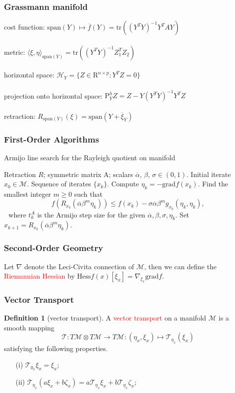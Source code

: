 \documentclass[notheorems,envcountsect,pdfpagemode=FullScreen,12pt]{beamer}
\theoremstyle{plain}
\theoremstyle{definition}
\newtheorem{defin}{Definition}
\theoremstyle{example}
\begin{document}
\begin{frame}
\frametitle{Grassmann manifold}
cost function: $\mathrm{span}(Y)\mapsto\overline{f}(Y)=\mathrm{tr}((Y^TY)^{-1}Y^TAY)$
\\~\\
metric: $\langle\xi,\eta\rangle_{\mathrm{span}(Y)}=\mathrm{tr}((Y^TY)^{-1}Z_1^TZ_2)$
\\~\\
horizontal space: $\mathcal{H}_Y=\{Z\in\mathrm{R}^{n\times p}:Y^T Z=0\}$
\\~\\
projection onto horizontal space: $\mathrm{P}_Y^h Z=Z-Y(Y^TY)^{-1}Y^TZ$
\\~\\
retraction: $R_{\mathrm{span}(Y)}(\xi)=\mathrm{span}(Y+\overline{\xi}_Y)$
\end{frame}

\begin{frame}
\frametitle{First-Order Algorithms}
\begin{algorithm}[H]
\caption{Armijo line search for the Rayleigh quotient on manifold}
\begin{algorithmic}[1]
\Require Retraction $R$; symmetric matrix A; scalars $\overline{\alpha}$, $\beta$, $\sigma\in(0,1)$.
\Input Initial iterate $x_0\in\mathcal{M}$.
\Output Sequence of iterates $\{x_k\}$.
\State Compute $\eta_k=-\mathrm{grad}f(x_k)$.
\State Find the smallest integer $m\geqslant 0$ such that
$$f(R_{x_k}(\overline{\alpha}\beta^m\eta_k))\leqslant f(x_k)-\sigma\overline{\alpha}\beta^m g_{x_k}(\eta_k,\eta_k),$$
\quad\ \,where $t_k^A$ is the Armijo step size for the given $\overline{\alpha}, \beta, \sigma, \eta_k$.
\State Set $x_{k+1}=R_{x_k}(\overline{\alpha}\beta^m\eta_k)$.
\EndFor
\end{algorithmic}
\end{algorithm}
\end{frame}

\begin{frame}
\frametitle{Second-Order Geometry}
\quad Let $\nabla$ denote the Leci-Civita connection of $\mathcal{M}$, then we can define the \textcolor{red}{Riemannian Hessian} by $\mathrm{Hess}f(x)[\xi_x]=\nabla_{\xi_x}\mathrm{grad}f$.
\end{frame}

\begin{frame}
\frametitle{Vector Transport}
\begin{defin}[vector transport]
A \textcolor{red}{vector transport} on a manifold $\mathcal{M}$ is a smooth mapping
$$\mathcal{T}:T\mathcal{M}\otimes T\mathcal{M}\to T\mathcal{M}:(\eta_x,\xi_x)\mapsto\mathcal{T}_{\eta_x}(\xi_x)$$
satisfying the following properties.
\begin{itemize}
\item[(i)] $\mathcal{T}_{0_x}\xi_x=\xi_x$;
\item[(ii)] $\mathcal{T}_{\eta_x}(a\xi_x+b\zeta_x)=a\mathcal{T}_{\eta_x}\xi_x+b\mathcal{T}_{\eta_x}\zeta_x$;
\end{itemize}
\end{defin}
\end{frame}
\end{document}
